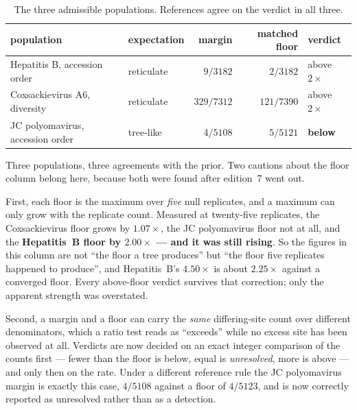 \documentclass[11pt,a4paper]{article}
\theoremstyle{definition}
\theoremstyle{remark}
\begin{document}
\begin{table}[h]
\centering\small
\caption{The three admissible populations. References agree on the verdict in all
three.}
\label{tab:real}
\begin{tabular}{@{}llrrl@{}}
\toprule
population & expectation & margin & matched floor & verdict \\
\midrule
Hepatitis B, accession order & reticulate & $9/3182$ & $2/3182$ & above $2\times$ \\
Coxsackievirus A6, diversity & reticulate & $329/7312$ & $121/7390$ & above $2\times$ \\
JC polyomavirus, accession order & tree-like & $4/5108$ & $5/5121$ & \textbf{below} \\
\bottomrule
\end{tabular}
\end{table}

Three populations, three agreements with the prior. Two cautions about the
floor column belong here, because both were found after edition~7 went out.

First, each floor is the maximum over \emph{five} null replicates, and a maximum
can only grow with the replicate count. Measured at twenty-five replicates, the
Coxsackievirus floor grows by $1.07\times$, the JC polyomavirus floor not at all,
and the \textbf{Hepatitis~B floor by $2.00\times$ --- and it was still rising}.
So the figures in this column are not ``the floor a tree produces'' but ``the
floor five replicates happened to produce'', and Hepatitis~B's $4.50\times$ is
about $2.25\times$ against a converged floor. Every above-floor verdict survives
that correction; only the apparent strength was overstated.

Second, a margin and a floor can carry the \emph{same} differing-site count over
different denominators, which a ratio test reads as ``exceeds'' while no excess
site has been observed at all. Verdicts are now decided on an exact integer
comparison of the counts first --- fewer than the floor is below, equal is
\emph{unresolved}, more is above --- and only then on the rate. Under a different
reference rule the JC polyomavirus margin is exactly this case, $4/5108$ against
a floor of $4/5123$, and is now correctly reported as unresolved rather than as a
detection.
\end{document}
